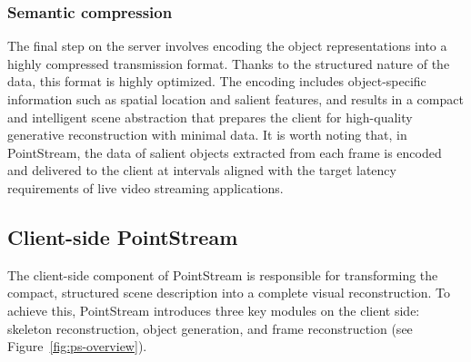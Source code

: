 \documentclass[manuscript, screen]{acmart}
\begin{document}
\subsubsection*{Semantic compression}
The final step on the server involves encoding the object representations into a highly compressed transmission format. Thanks to the structured nature of the data, this format is highly optimized.
The encoding includes object-specific information such as spatial location and salient features, and results in a compact and intelligent scene abstraction that prepares the client for high-quality generative reconstruction with minimal data. It is worth noting that, in PointStream, the data of salient objects extracted from each frame is encoded and delivered to the client at intervals aligned with the target latency requirements of live video streaming applications.


\subsection{Client-side PointStream}
The client-side component of PointStream is responsible for transforming the compact, structured scene description into a complete visual reconstruction. To achieve this, PointStream introduces three key modules on the client side: skeleton reconstruction, object generation, and frame reconstruction (see Figure~\ref{fig:ps-overview}).
\end{document}
